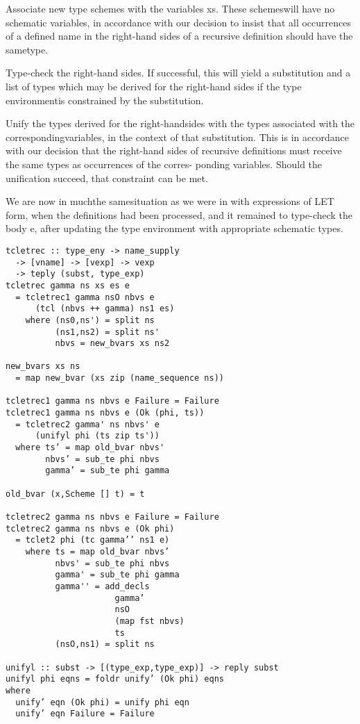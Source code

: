 \documentclass[8pt]{extarticle}
\begin{document}
\begin{multicols*}{2}
Associate new type schemes with the variables xs. These schemeswill
have no schematic variables, in accordance with our decision to insist
that all occurrences of a defined name in the right-hand sides of a
recursive definition should have the sametype.

Type-check the right-hand sides. If successful, this will yield a
substitution and a list of types which may be derived for the right-hand
sides if the type environmentis constrained by the substitution.

Unify the types derived for the right-handsides with the types associated
with the correspondingvariables, in the context of that substitution. This
is in accordance with our decision that the right-hand sides of recursive
definitions must receive the same types as occurrences of the corres-
ponding variables. Should the unification succeed, that constraint can be
met.

We are now in muchthe samesituation as we were in with expressions of
LET form, when the definitions had been processed, and it remained to
type-check the body e, after updating the type environment with
appropriate schematic types.

\begin{verbatim}
tcletrec :: type_eny -> name_supply
  -> [vname] -> [vexp] -> vexp
  -> teply (subst, type_exp)
tcletrec gamma ns xs es e
  = tcletrec1 gamma nsO nbvs e
      (tcl (nbvs ++ gamma) ns1 es)
    where (ns0,ns') = split ns
          (ns1,ns2) = split ns'
          nbvs = new_bvars xs ns2

new_bvars xs ns 
  = map new_bvar (xs zip (name_sequence ns))

tcletrec1 gamma ns nbvs e Failure = Failure
tcletrec1 gamma ns nbvs e (Ok (phi, ts))
  = tcletrec2 gamma' ns nbvs' e
      (unifyl phi (ts zip ts'))
  where ts’ = map old_bvar nbvs'
        nbvs’ = sub_te phi nbvs
        gamma’ = sub_te phi gamma

old_bvar (x,Scheme [] t) = t

tcletrec2 gamma ns nbvs e Failure = Failure
tcletrec2 gamma ns nbvs e (Ok phi)
  = tclet2 phi (tc gamma’’ ns1 e)
    where ts = map old_bvar nbvs’
          nbvs' = sub_te phi nbvs
          gamma' = sub_te phi gamma
          gamma'' = add_decls
                      gamma’
                      nsO
                      (map fst nbvs)
                      ts
          (nsO,ns1) = split ns

unifyl :: subst -> [(type_exp,type_exp)] -> reply subst
unifyl phi eqns = foldr unify’ (Ok phi) eqns
where
  unify’ eqn (Ok phi) = unify phi eqn
  unify’ eqn Failure = Failure
\end{verbatim}


\end{multicols*}
\end{document}
